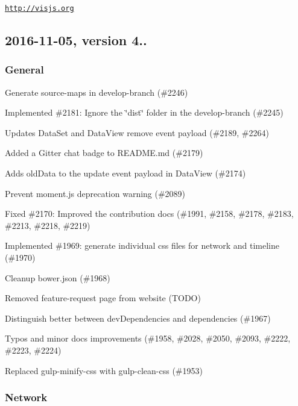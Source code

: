 \href{http://visjs.org}{\tt http\+://visjs.\+org}

\subsection*{2016-\/11-\/05, version 4..}

\subsubsection*{General}


\begin{DoxyItemize}
\item Generate source-\/maps in develop-\/branch (\#2246)
\item Implemented \#2181\+: Ignore the \char`\"{}dist\char`\"{} folder in the develop-\/branch (\#2245)
\item Updates Data\+Set and Data\+View remove event payload (\#2189, \#2264)
\item Added a Gitter chat badge to R\+E\+A\+D\+M\+E.\+md (\#2179)
\item Adds {\ttfamily old\+Data} to the update event payload in Data\+View (\#2174)
\item Prevent moment.\+js deprecation warning (\#2089)
\item Fixed \#2170\+: Improved the contribution docs (\#1991, \#2158, \#2178, \#2183, \#2213, \#2218, \#2219)
\item Implemented \#1969\+: generate individual css files for network and timeline (\#1970)
\item Cleanup bower.\+json (\#1968)
\item Removed feature-\/request page from website (T\+O\+DO)
\item Distinguish better between {\ttfamily dev\+Dependencies} and {\ttfamily dependencies} (\#1967)
\item Typos and minor docs improvements (\#1958, \#2028, \#2050, \#2093, \#2222, \#2223, \#2224)
\item Replaced {\ttfamily gulp-\/minify-\/css} with {\ttfamily gulp-\/clean-\/css} (\#1953)
\end{DoxyItemize}

\subsubsection*{Network}


